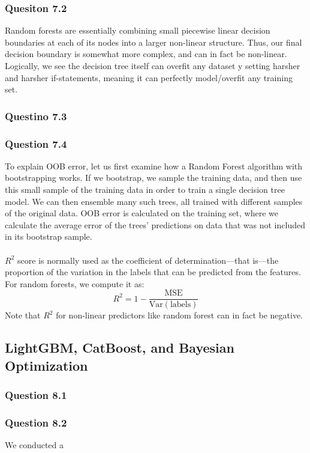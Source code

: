 \documentclass[11pt,letterpaper]{article}
\begin{document}
\subsubsection*{Quesiton 7.2}
Random forests are essentially combining small piecewise linear decision boundaries 
at each of its nodes into a larger non-linear structure. Thus, our final decision 
boundary is somewhat more complex, and can in fact be non-linear. Logically, we see
the decision tree itself can overfit any dataset y setting harsher and harsher if-statements,
meaning it can perfectly model/overfit any training set. 
\subsubsection*{Questino 7.3}

\subsubsection*{Question 7.4}
To explain OOB error, let us first examine how a Random Forest algorithm with
bootstrapping works. If we bootstrap, we sample the training data, and then use 
this small sample of the training data in order to train a single decision tree model.
We can then ensemble many such trees, all trained with different samples of the original
data. OOB error is calculated on the training set, where we calculate the average error 
of the trees' predictions on data that was not included in its bootstrap sample. \\\\
$R^2$ score is normally used as the coefficient of determination—that is—the proportion
of the variation in the labels that can be predicted from the features. For random 
forests, we compute it as:
\[R^2 = 1- \dfrac{\text{MSE}}{\text{Var}(\text{labels})}
    \]
Note that $R^2$ for non-linear predictors like random forest can in fact be negative.



\subsection*{LightGBM, CatBoost, and Bayesian Optimization}
\subsubsection*{Question 8.1}
\subsubsection*{Question 8.2}
We conducted a 
\end{document}
